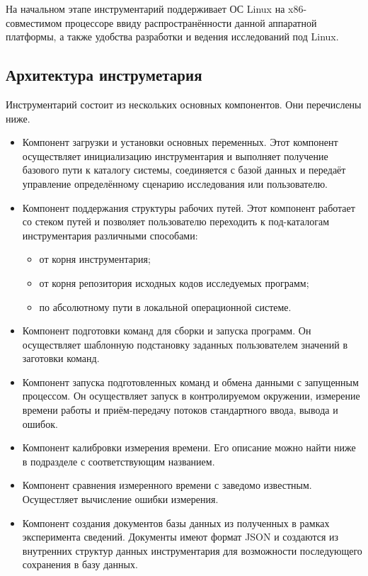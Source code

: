 На начальном этапе инструментарий поддерживает ОС Linux на x86-совместимом процессоре ввиду распространённости данной аппаратной платформы, а также удобства разработки и ведения исследований под Linux.

\subsection{Архитектура инструметария}
Инструментарий состоит из нескольких основных компонентов. Они перечислены ниже.

\begin{itemize}
    \item Компонент загрузки и установки основных переменных. Этот компонент осуществляет инициализацию инструментария и выполняет получение базового пути к каталогу системы, соединяется с базой данных и передаёт управление определённому сценарию исследования или пользователю.
    \item Компонент поддержания структуры рабочих путей. Этот компонент работает со стеком путей и позволяет пользователю переходить к под-каталогам инструментария различными способами:
    \begin{itemize}
        \item от корня инструментария;
        \item от корня репозитория исходных кодов исследуемых программ;
        \item по абсолютному пути в локальной операционной системе.
    \end{itemize}
    \item Компонент подготовки команд для сборки и запуска программ. Он осуществляет шаблонную подстановку заданных пользователем значений в заготовки команд.
    \item Компонент запуска подготовленных команд и обмена данными с запущенным процессом. Он осуществляет запуск в контролируемом окружении, измерение времени работы и приём-передачу потоков стандартного ввода, вывода и ошибок.
    \item Компонент калибровки измерения времени. Его описание можно найти ниже в подразделе с соответствующим названием.
    \item Компонент сравнения измеренного времени с заведомо известным. Осущестляет вычисление ошибки измерения.
    \item Компонент создания документов базы данных из полученных в рамках эксперимента сведений. Документы имеют формат JSON \cite{json} и создаются из внутренних структур данных инструментария для возможности последующего сохранения в базу данных.
\end{itemize}

